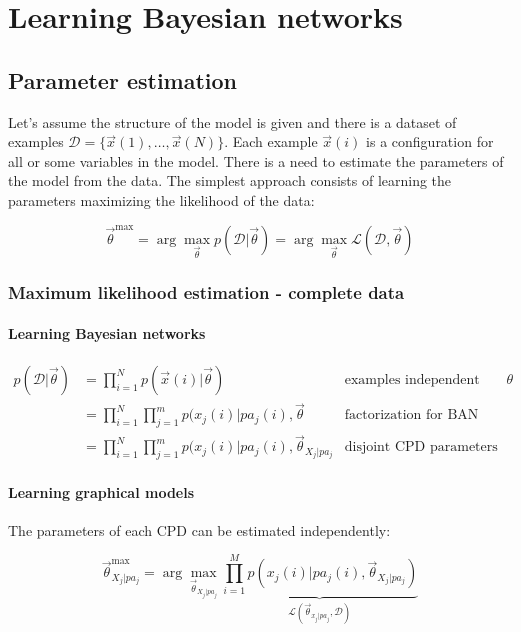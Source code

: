 \chapter{Learning Bayesian networks}

\section{Parameter estimation}
Let's assume the structure of the model is given and there is a dataset of examples $\mathcal{D} =\{\vec{x}(1), \dots, \vec{x}(N)\}$.
Each example $\vec{x}(i)$ is a configuration for all or some variables in the model.
There is a need to estimate the parameters of the model from the data.
The simplest approach consists of learning the parameters maximizing the likelihood of the data:

$$\vec{\theta}^{\max} = \arg\max\limits_{\vec{\theta}}p(\mathcal{D}|\vec{\theta})=\arg\max\limits_{\vec{\theta}}\mathcal{L}(\mathcal{D}, \vec{\theta})$$

	\subsection{Maximum likelihood estimation - complete data}

		\subsubsection{Learning Bayesian networks}

		\begin{align*}
			p(\mathcal{D}|\vec{\theta}) &=\prod\limits_{i=1}^Np(\vec{x}(i)|\vec{\theta})&\text{examples independent given }\theta\\
																	&=\prod\limits_{i=1}^N\prod\limits_{j=1}^mp(x_j(i)|pa_j(i),\vec{\theta} &\text{factorization for BAN}\\
																	&=\prod\limits_{i=1}^N\prod\limits_{j=1}^mp(x_j(i)|pa_j(i),\vec{\theta}_{X_j|pa_j} &\text{disjoint CPD parameters}
		\end{align*}

		\subsubsection{Learning graphical models}
		The parameters of each CPD can be estimated independently:

		$$\vec{\theta}^{\max}_{X_j|pa_j} = \arg\max\limits_{\vec{\theta}_{X_j|pa_j}}\underbrace{\prod\limits_{i=1}^Mp(x_j(i)|pa_j(i),\vec{\theta}_{X_j|pa_j})}_{\mathcal{L}(\vec{\theta}_{x_j|pa_j},\mathcal{D})}$$

